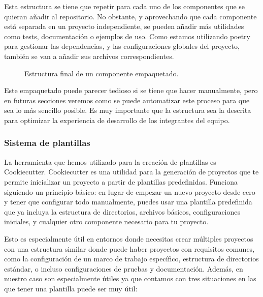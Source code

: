 Esta estructura se tiene que repetir para cada uno de los componentes que se quieran
añadir al repositorio. No obstante, y aprovechando que cada componente está separada
en un proyecto independiente, se pueden añadir más utilidades como tests, documentación
o ejemplos de uso. Como estamos utilizando poetry para gestionar las dependencias, y
las configuraciones globales del proyecto, también se van a añadir sus archivos correspondientes. 

\begin{figure}[ht]
    \caption{Estructura final de un componente empaquetado.}
    \label{fig:real-package}
\end{figure}

Este empaquetado puede parecer tedioso si se tiene que hacer manualmente, pero en
futuras secciones veremos como se puede automatizar este proceso para que sea lo más
sencillo posible. Es muy importante que la estructura sea la descrita para optimizar
la experiencia de desarrollo de los integrantes del equipo.

\subsubsection{Sistema de plantillas}
La herramienta que hemos utilizado para la creación de plantillas es Cookiecutter.
Cookiecutter es una utilidad para la generación de proyectos que te permite inicializar
un proyecto a partir de plantillas predefinidas. Funciona siguiendo un principio 
básico: en lugar de empezar un nuevo proyecto desde cero y tener que configurar 
todo manualmente, puedes usar una plantilla predefinida que ya incluya la estructura 
de directorios, archivos básicos, configuraciones iniciales, y cualquier otro 
componente necesario para tu proyecto.\medskip

Esto es especialmente útil en entornos donde necesitas crear múltiples proyectos 
con una estructura similar donde puede haber proyectos con requisitos comunes, 
como la configuración de un marco de trabajo específico, estructura de directorios 
estándar, o incluso configuraciones de pruebas y documentación. Además, en nuestro
caso son especialmente útiles ya que contamos con tres situaciones en las que tener
una plantilla puede ser muy útil:

